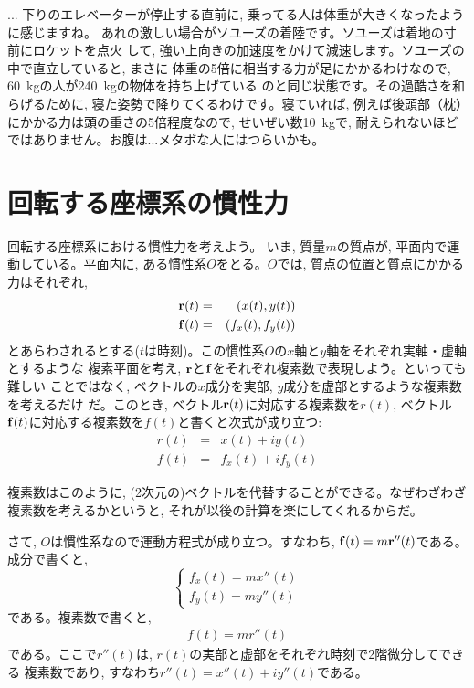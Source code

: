 \begin{faq}{\small{} ... 
下りのエレベーターが停止する直前に, 乗ってる人は体重が大きくなったように感じますね。
あれの激しい場合がソユーズの着陸です。ソユーズは着地の寸前にロケットを点火
して, 強い上向きの加速度をかけて減速します。ソユーズの中で直立していると, まさに
体重の5倍に相当する力が足にかかるわけなので, 60~kgの人が240~kgの物体を持ち上げている
のと同じ状態です。その過酷さを和らげるために, 寝た姿勢で降りてくるわけです。寝ていれば, 
例えば後頭部（枕）にかかる力は頭の重さの5倍程度なので, せいぜい数10~kgで, 
耐えられないほどではありません。お腹は...メタボな人にはつらいかも。
}\end{faq}\hv


\section{回転する座標系の慣性力}\label{sec:inertforce_rotate}

回転する座標系における慣性力を考えよう。
いま, 質量$m$の質点が, 平面内で運動している。平面内に, ある慣性系$O$をとる。$O$では, 
質点の位置と質点にかかる力はそれぞれ, 
\begin{eqnarray}
{\bf r}(t)&=&(x(t), y(t))\\
{\bf f}(t)&=&(f_x(t), f_y(t))
\end{eqnarray}
とあらわされるとする($t$は時刻)。この慣性系$O$の$x$軸と$y$軸をそれぞれ実軸・虚軸とするような
複素平面を考え, ${\bf r}$と${\bf f}$をそれぞれ複素数で表現しよう。といっても難しい
ことではなく, ベクトルの$x$成分を実部, $y$成分を虚部とするような複素数を考えるだけ
だ。このとき, ベクトル${\bf r}(t)$に対応する複素数を$r(t)$, 
ベクトル${\bf f}(t)$に対応する複素数を$f(t)$と書くと次式が成り立つ:
\begin{eqnarray}
r(t)&=&x(t)+iy(t)\\
f(t)&=&f_x(t)+if_y(t)
\end{eqnarray}

複素数はこのように, (2次元の)ベクトルを代替することができる。なぜわざわざ
複素数を考えるかというと, それが以後の計算を楽にしてくれるからだ。

さて, $O$は慣性系なので運動方程式が成り立つ。すなわち, 
${\bf f}(t)=m{\bf r}''(t)$である。成分で書くと, 
\begin{equation}\begin{cases}
f_x(t)=mx''(t)\\
f_y(t)=my''(t)
\end{cases}\end{equation}
である。複素数で書くと, 
\begin{eqnarray}
f(t)=mr''(t)
\end{eqnarray}
である。ここで$r''(t)$は, $r(t)$の実部と虚部をそれぞれ時刻で2階微分してできる
複素数であり, すなわち$r''(t)=x''(t)+iy''(t)$である。\mv

